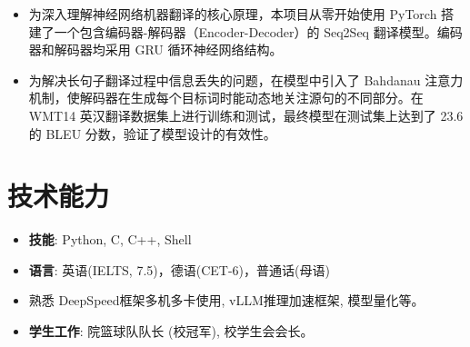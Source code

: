 \documentclass{cls/resume}
\begin{document}
\begin{itemize}
  \item 为深入理解神经网络机器翻译的核心原理，本项目从零开始使用 PyTorch 搭建了一个包含编码器-解码器（Encoder-Decoder）的 Seq2Seq 翻译模型。编码器和解码器均采用 GRU 循环神经网络结构。
  \item 为解决长句子翻译过程中信息丢失的问题，在模型中引入了 Bahdanau 注意力机制，使解码器在生成每个目标词时能动态地关注源句的不同部分。在 WMT14 英汉翻译数据集上进行训练和测试，最终模型在测试集上达到了 23.6 的 BLEU 分数，验证了模型设计的有效性。
\end{itemize}

\section{技术能力}
\begin{itemize}[parsep=0.2ex]
    \item \textbf{技能}: Python, C, C++, Shell
    \item \textbf{语言}: 英语(IELTS, 7.5)，德语(CET-6)，普通话(母语)
    \item 熟悉 DeepSpeed框架多机多卡使用, vLLM推理加速框架, 模型量化等。
    \item \textbf{学生工作}: 院篮球队队长 (校冠军), 校学生会会长。
\end{itemize}
\end{document}
